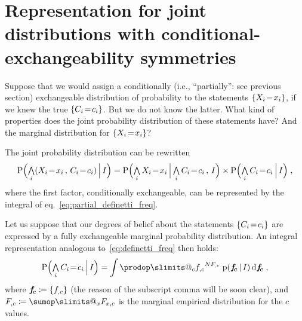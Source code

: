 \documentclass[\ifafour a4paper,12pt,\else a5paper,10pt,\fi%
onecolumn,oneside,article,%
british%
]{memoir}
\makeatletter
\theoremstyle{remark}
\theoremstyle{innote}
\def\sum{\DOTSI\sumop\slimits@}
\def\prod{\DOTSI\prodop\slimits@}
\newcommand*{\di}{\mathrm{d}}%
\newcommand*{\defd}{\coloneqq}
\newcommand*{\Land}{\mathop{\textstyle\bigwedge}}
\DeclarePairedDelimiter\set{\{}{\}}
\newcommand*{\pf}{\mathrm{p}}%
\newcommand*{\p}{\mathrm{P}}%
\renewcommand*{\|}[1][]{\nonscript\,#1\vert\nonscript\,\mathopen{}}
\newcommand*{\eqn}{eq.}%
\newcommand*{\ie}{{i.e.}}
\renewcommand*{\=}{\TextOrMath\texteq\eq}
\newcommand*{\X}[1]{X_{#1}}
\newcommand*{\x}[1]{x_{#1}}
\newcommand*{\C}[1]{C_{#1}}
\newcommand*{\cc}[1]{c_{#1}}
\newcommand*{\fc}{\bm{f_{\!c}}}
\makeatother
\begin{document}
\section{Representation for joint distributions with
  conditional-exchangeability symmetries}
\label{sec:result}

Suppose that we would assign a conditionally (\ie, \enquote{partially}: see
previous section) exchangeable distribution of probability to the
statements $\set{\X{i}\=\x{i}}$, if we knew the true $\set{\C{i}\=\cc{i}}$.
But we do not know the latter. What kind of properties does the joint
probability distribution of these statements have? And the marginal
distribution for $\set{\X{i}\=\x{i}}$?

The joint probability distribution can be rewritten
\begin{equation}
  \label{eq:joint_p_xc_decomposed}
  \p\Bigl(\Land_{i} (\X{i}\=\x{i}\,,\, \C{i}\=\cc{i}) \|[\Big] I\Bigr) =%
  \p\Bigl(\Land_{i} \X{i}\=\x{i} \|[\Big] \Land_{i} \C{i}\=\cc{i}
  \,,\, I\Bigr) \times
  \p\Bigl(\Land_{i} \C{i}\=\cc{i} \|[\Big] I\Bigr)
  \;,
\end{equation}
where the first factor, conditionally exchangeable, can be represented by
the integral of \eqn~\eqref{eq:partial_definetti_freq}.

Let us suppose that our degrees of belief about the statements
$\set{\C{i}\=\cc{i}}$ are expressed by a fully exchangeable marginal
probability distribution. An integral representation analogous
to~\eqref{eq:definetti_freq} then holds:
\begin{equation}
  \label{eq:definetti_freq_C}
  \p\Bigl( \Land_{i}\C{i}\=\cc{i} \|[\Big] I\Bigr) =
\int\prod_{c} {f_{,c}}^{N F_{,c}}\;   \pf(\fc \| I)\,\di\fc \;,
\end{equation}
where $\fc \defd \set{f_{,c}}$ (the reason of the subscript comma will be
soon clear), and $F_{,c} \defd \sum_{x} F_{x,c}$ is the marginal empirical
distribution for the $c$ values.
\end{document}

